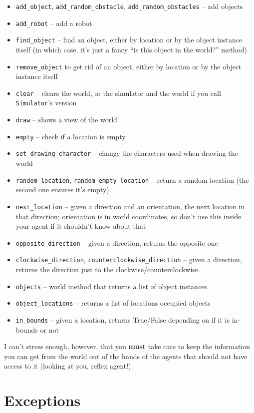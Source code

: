 \documentclass[11pt]{tufte-handout}
\begin{document}
\begin{itemize}
\item \texttt{add\_object}, \texttt{add\_random\_obstacle}, \texttt{add\_random\_obstacles} -- add objects
\item \texttt{add\_robot} -- add a robot
\item \texttt{find\_object} -- find an object, either by location or by the object instance itself (in which case, it's just a fancy ``is this object in the world?'' method)
\item \texttt{remove\_object} to get rid of an object, either by location or by the object instance itself
\item \texttt{clear} -- clears the world, or the simulator and the world if you call \texttt{Simulator}'s version
\item \texttt{draw} -- shows a view of the world
\item \texttt{empty} -- check if a location is empty
\item \texttt{set\_drawing\_character} -- change the characters used when drawing the world
\item \texttt{random\_location}, \texttt{random\_empty\_location} -- return a random location (the second one ensures it's empty)
\item \texttt{next\_location} --  given a direction and an orientation, the next location in that direction; orientation is in world coordinates, so don't use this inside your agent if it shouldn't know about that
\item \texttt{opposite\_direction} -- given a direction, returns the opposite one
\item \texttt{clockwise\_direction}, \texttt{counterclockwise\_direction} -- given a direction, returns the direction just to the clockwise/counterclockwise.
\item \texttt{objects}  -- world method that returns a list of object instances
\item \texttt{object\_locations} -- returns a list of  locations occupied objects
\item \texttt{in\_bounds} -- given a location, returns True/False depending on if it is in-bounds or not
\end{itemize}

I can't stress enough, however, that you \textbf{must} take care to keep the information you can get from the world out of the hands of the agents that should not have access to it (looking at you, reflex agent!).

\section{Exceptions}
\label{sec:orge8f5298}
\end{document}
